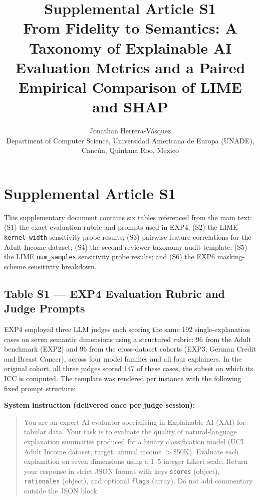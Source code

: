 \documentclass[11pt]{article}
\title{Supplemental Article S1\\[4pt]
\large From Fidelity to Semantics: A Taxonomy of Explainable AI Evaluation
Metrics and a Paired Empirical Comparison of LIME and SHAP}
\author{Jonathan Herrera-V\'asquez\\
\small Department of Computer Science, Universidad Americana de Europa (UNADE),\\
Canc\'un, Quintana Roo, Mexico}
\date{}
\begin{document}
\maketitle

\appendix

\section*{Supplemental Article S1}
\label{sec:supplementary}

This supplementary document contains six tables referenced from the main
text: (S1) the exact evaluation rubric and prompts used in EXP4; (S2) the
LIME \texttt{kernel\_width} sensitivity probe results; (S3) pairwise
feature correlations for the Adult Income dataset; (S4) the
second-reviewer taxonomy audit template; (S5) the LIME \texttt{num\_samples}
sensitivity probe results; and (S6) the EXP6 masking-scheme sensitivity
breakdown.

\subsection*{Table S1 --- EXP4 Evaluation Rubric and Judge Prompts}
\label{sec:supp_exp4_rubric}

EXP4 employed three LLM judges each scoring the same 192 single-explanation
cases on seven semantic dimensions using a structured rubric: 96 from the
Adult benchmark (EXP2) and 96 from the cross-dataset cohorts (EXP3; German
Credit and Breast Cancer), across four model families and all four explainers.
In the original cohort, all three judges scored 147 of these cases, the
subset on which its ICC is computed.
The template was rendered per instance with the following fixed prompt
structure:

\medskip
\noindent\textbf{System instruction (delivered once per judge session):}
\begin{quote}\small
You are an expert AI evaluator specialising in Explainable AI (XAI) for
tabular data. Your task is to evaluate the quality of natural-language
explanation summaries produced for a binary classification model
(UCI Adult Income dataset, target: annual income $>$\$50K). Evaluate each
explanation on seven dimensions using a 1--5 integer Likert scale. Return
your response in strict JSON format with keys \texttt{scores} (object),
\texttt{rationales} (object), and optional \texttt{flags} (array). Do not
add commentary outside the JSON block.
\end{quote}
\end{document}

